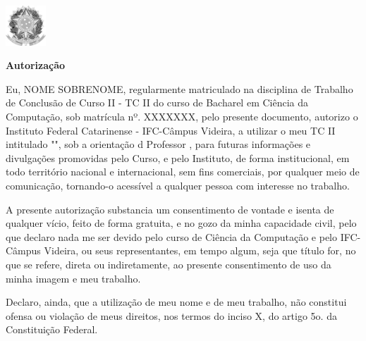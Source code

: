 \begin{folhadeautorizacao}

  \begin{center}
  \vspace*{1 cm}
  \vspace{-2cm}
   \centering\includegraphics[width=1.5cm]{figuras/brasaoRepublicaPeB.jpg}
   \vspace{-0.5 cm}
    {\large \SingleSpacing \imprimirinstituicao}
    \vspace{-0.5cm}
    \center{ \hrulefill}
    
     {\large \SingleSpacing \textbf{Autorização}}
    
    
    \vspace*{1 cm}
    
    \vspace*{0.5 cm}
    
   \end{center}
   


Eu, NOME SOBRENOME, regularmente matriculado na disciplina de Trabalho de Conclusão de Curso II - TC II do curso de Bacharel em Ciência da Computação, sob matrícula nº. XXXXXXX, pelo presente documento, autorizo o Instituto Federal Catarinense - IFC-Câmpus Videira, a utilizar o meu TC II intitulado "\imprimirtitulo", sob a orientação d Professor \imprimirorientador, para futuras informações e divulgações promovidas pelo Curso, e pelo Instituto, de forma institucional, em todo território nacional e internacional, sem fins comerciais, por qualquer meio de comunicação, tornando-o acessível a qualquer pessoa com interesse no trabalho.

A presente autorização substancia um consentimento de vontade e isenta de qualquer vício, feito de forma gratuita, e no gozo da minha capacidade civil, pelo que declaro nada me ser devido pelo curso de Ciência da Computação e pelo IFC-Câmpus Videira, ou seus representantes, em tempo algum, seja que título for, no que se refere, direta ou indiretamente, ao presente consentimento de uso da minha imagem e meu trabalho.

Declaro, ainda, que a utilização de meu nome e de meu trabalho, não constitui ofensa ou violação de meus direitos, nos termos do inciso X, do artigo 5o. da Constituição Federal.


\end{folhadeautorizacao}
